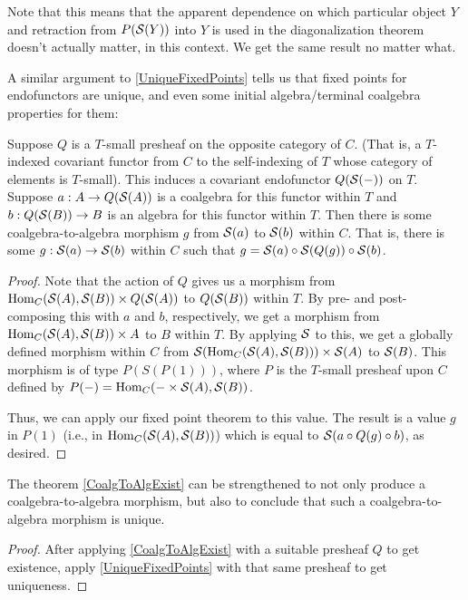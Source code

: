 \begin{observation}
Note that this means that the apparent dependence on which particular object $Y$ and retraction from $P(\mathcal{S}(Y))$ into $Y$ is used in the diagonalization theorem doesn't actually matter, in this context. We get the same result no matter what.
\end{observation}

A similar argument to \cref{UniqueFixedPoints} tells us that fixed points for endofunctors are unique, and even some initial algebra/terminal coalgebra properties for them: \TODO

\begin{theorem}\label{CoalgToAlgExist}
Suppose $Q$ is a $T$-small presheaf on the opposite category of $C$. (That is, a $T$-indexed covariant functor from $C$ to the self-indexing of $T$ whose category of elements is $T$-small). This induces a covariant endofunctor $Q(\mathcal{S}(-))$ on $T$. Suppose $a : A \to Q(\mathcal{S}(A))$ is a coalgebra for this functor within $T$ and $b : Q(\mathcal{S}(B)) \to B$ is an algebra for this functor within $T$. Then there is some coalgebra-to-algebra morphism $g$ from $\mathcal{S}(a)$ to $\mathcal{S}(b)$ within $C$. That is, there is some $g : \mathcal{S}(a) \to \mathcal{S}(b)$ within $C$ such that $g = \mathcal{S}(a) \circ \mathcal{S}(Q(g)) \circ \mathcal{S}(b)$.
\end{theorem}
\begin{proof}
Note that the action of $Q$ gives us a morphism from $\operatorname{Hom}_C(\mathcal{S}(A), \mathcal{S}(B)) \times Q(\mathcal{S}(A))$ to $Q(\mathcal{S}(B))$ within $T$. By pre- and post-composing this with $a$ and $b$, respectively, we get a morphism from $\operatorname{Hom}_C(\mathcal{S}(A), \mathcal{S}(B)) \times A$ to $B$ within $T$. By applying $\mathcal{S}$ to this, we get a globally defined morphism within $C$ from $\mathcal{S}(\operatorname{Hom}_C(\mathcal{S}(A), \mathcal{S}(B))) \times \mathcal{S}(A)$ to $\mathcal{S}(B)$. This morphism is of type $P(S(P(1)))$, where $P$ is the $T$-small presheaf upon $C$ defined by $P(-) = \operatorname{Hom}_C(- \times \mathcal{S}(A), \mathcal{S}(B))$.

Thus, we can apply our fixed point theorem  to this value. The result is a value $g$ in $P(1)$ (i.e., in $\operatorname{Hom}_C(\mathcal{S}(A), \mathcal{S}(B))$) which is equal to $\mathcal{S}(a \circ Q(g) \circ b)$, as desired.

\end{proof}

\begin{theorem}
The theorem \cref{CoalgToAlgExist} can be strengthened to not only produce a coalgebra-to-algebra morphism, but also to conclude that such a coalgebra-to-algebra morphism is unique.
\end{theorem}
\begin{proof}
After applying \cref{CoalgToAlgExist} with a suitable presheaf $Q$ to get existence, apply \cref{UniqueFixedPoints} with that same presheaf to get uniqueness.
\end{proof}

